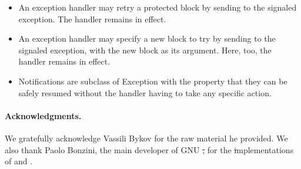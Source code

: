 \documentclass[a4paper,10pt,twoside]{book}
\begin{document}
\begin{itemize}
\item An exception handler may retry a protected block by sending  to the signaled exception. The handler remains in effect.

\item An exception handler may specify a new block to try by sending  to the signaled exception, with the new block as its argument. Here, too, the handler remains in effect.

\item Notifications are subclass of Exception with the property that they can be safely resumed without the handler having to take any specific action.

\end{itemize}

\paragraph{Acknowledgments.}  We gratefully acknowledge Vassili Bykov for the raw material he provided. We also thank Paolo Bonzini, the main developer of GNU \st, for the \st implementations of  and .

\ifx\wholebook\relax\else
   
   
\end{document}
